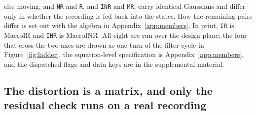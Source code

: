 \begin{table}[htbp]
{else moving, and \texttt{NR} and \texttt{R}, and \texttt{INR} and \texttt{MR}, carry identical
Gaussians and differ only in whether the recording is fed back into the states. How the remaining
pairs differ is set out with the algebra in Appendix~\ref{app:members}.
In print, \texttt{IR} is MacroIR and \texttt{INR} is
MacroINR. All eight are run over the design plane; the four that
cross the two axes are drawn as one turn of the filter cycle in Figure~\ref{fig:ladder}, the
equation-level specification is
Appendix~\ref{app:members}, and the dispatched flags and data keys are in
the supplemental material.}
\label{tab:members}
\end{table}


\subsection*{The distortion is a matrix, and only the residual check runs on a real recording}

